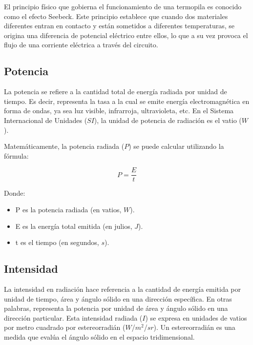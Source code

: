 \documentclass[letterpaper, 12pt]{article}
\begin{document}
El principio físico que gobierna el funcionamiento de una
termopila es conocido como el efecto Seebeck. Este
principio establece que cuando dos materiales diferentes
entran en contacto y están sometidos a diferentes
temperaturas, se origina una diferencia de potencial
eléctrico entre ellos, lo que a su vez provoca el flujo de
una corriente eléctrica a través del circuito.

\subsection{Potencia~\cite{Blackbody_radiation}}

La potencia se refiere a la cantidad total de energía
radiada por unidad de tiempo. Es decir, representa la tasa
a la cual se emite energía electromagnética en forma de
ondas, ya sea luz visible, infrarroja, ultravioleta, etc.
En el Sistema Internacional de Unidades ($SI$), la unidad
de potencia de radiación es el vatio ($W$).

Matemáticamente, la potencia radiada ($P$) se puede
calcular utilizando la fórmula:

\begin{equation*}
      P = \frac{E}{t}
\end{equation*}

Donde:

\begin{itemize}[label=$\triangleright$]
      \item P es la potencia radiada (en vatios, $W$).
      \item E es la energía total emitida (en julios, $J$).
      \item t es el tiempo (en segundos, $s$).
\end{itemize}

\subsection{Intensidad}

La intensidad en radiación hace referencia a la cantidad de
energía emitida por unidad de tiempo, área y ángulo sólido
en una dirección específica. En otras palabras, representa
la potencia por unidad de área y ángulo sólido en una
dirección particular. Esta intensidad radiada ($I$) se
expresa en unidades de vatios por metro cuadrado por
estereorradián ($W$/$m^2$/$sr$). Un estereorradián es una
medida que evalúa el ángulo sólido en el espacio
tridimensional.
\end{document}
